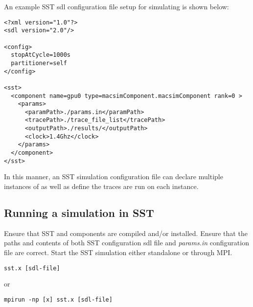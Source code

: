 An example SST sdl configuration file setup for simulating \SIM is shown below:

\begin{Verbatim}
<?xml version="1.0"?>
<sdl version="2.0"/>

<config>
  stopAtCycle=1000s
  partitioner=self
</config>

<sst>
  <component name=gpu0 type=macsimComponent.macsimComponent rank=0 >
    <params>
      <paramPath>./params.in</paramPath>
      <tracePath>./trace_file_list</tracePath>
      <outputPath>./results/</outputPath>
      <clock>1.4Ghz</clock>
    </params>
  </component>
</sst>
\end{Verbatim}

In this manner, an SST simulation configuration file can declare multiple
instances of \SIM as well as define the traces are run on each \SIM instance.

\subsection{Running a \SIM simulation in SST}

Ensure that SST and \SIM components are compiled and/or installed.  
Ensure that the paths and contents of both SST configuration sdl file and
\SIM \textit{params.in} configuration file are correct. Start the SST simulation 
either standalone or through MPI.

\begin{Verbatim}
sst.x [sdl-file]
\end{Verbatim}
or
\begin{Verbatim}
mpirun -np [x] sst.x [sdl-file]
\end{Verbatim}












